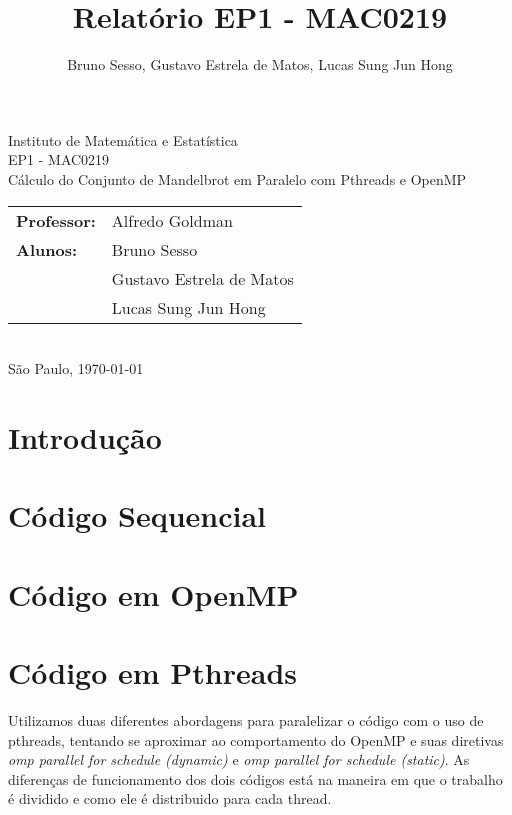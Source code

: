 \documentclass[12pt]{article}
\title{Relatório EP1 - MAC0219}
\author{Bruno Sesso, Gustavo Estrela de Matos, Lucas Sung Jun Hong}
\begin{document}
\doublespacing
\begin{titlepage}
    \vfill
    \begin{center}
        \vspace{0.5\textheight}
        \noindent
        Instituto de Matemática e Estatística \\
        EP1 - MAC0219 \\
        \vfill
        \noindent
        {\Large Cálculo do Conjunto de Mandelbrot
        em Paralelo com Pthreads e OpenMP} \\
        \bigskip
        \bigskip
        \begin{tabular}{ll}
            {\bf Professor:} & {Alfredo Goldman} \\
            {\bf Alunos:}    & {Bruno Sesso} \\
                             & {Gustavo Estrela de Matos} \\
                             & {Lucas Sung Jun Hong} \\
        \end{tabular} \\
        \vspace{\fill}
       \bigskip
        São Paulo, \today \\
       \bigskip
    \end{center}
\end{titlepage}

\pagebreak
\tableofcontents
\pagebreak

\section{Introdução}
\section{Código Sequencial}
\section{Código em OpenMP}


\section{Código em Pthreads}
Utilizamos duas diferentes abordagens para paralelizar o código com
o uso de pthreads, tentando se aproximar ao comportamento do OpenMP e 
suas diretivas {\em omp parallel for schedule (dynamic)} e {\em omp 
parallel for schedule (static)}. As diferenças de funcionamento dos 
dois códigos está na maneira em que o trabalho é dividido e como ele é
distribuido para cada thread.
\end{document}
